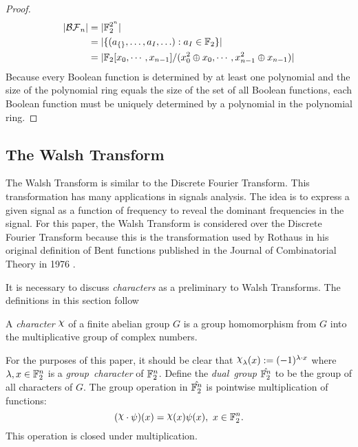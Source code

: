 \begin{proof}
  \begin{align*}
  \lvert\mathcal{BF}_n\rvert
    &= \lvert \mathbb{F}_2^{2^n} \rvert \\
    &= \lvert \{(a_{\{\}},\ldots,a_I,\ldots):a_I\in\mathbb{F}_2\} \rvert \\
    &= \lvert \mathbb{F}_2[x_0,\cdots,x_{n-1}]/ (x_0^2\oplus x_0,\cdots,
    x_{n-1}^2 \oplus x_{n-1})\rvert
  \end{align*}
  Because every Boolean function is determined by at least one polynomial
  and the size of the polynomial ring equals the size of the set of all
  Boolean functions, each Boolean function must be uniquely determined by a
  polynomial in the polynomial ring.
\end{proof}

\subsection{The Walsh Transform}
\par The Walsh Transform is similar to the Discrete Fourier Transform.
This transformation has many applications in signals
analysis. The idea is to express a given signal as a function of frequency
to reveal the dominant frequencies in the signal. For this paper, the Walsh
Transform is considered over the Discrete Fourier Transform because this is
the transformation used by Rothaus in his original definition of Bent
functions published in the Journal of Combinatorial Theory in 1976
\cite{art:r76}. 

\par It is necessary to discuss \textit{characters} as a preliminary to Walsh
Transforms. The definitions in this section follow \cite{bk:lsy11}

\begin{definition}
  A {\em character} $\Chi$ of a finite abelian group $G$ is a group
  homomorphism from $G$ into the multiplicative group of complex numbers.
\end{definition}

For the purposes of this paper, it should be clear that
$\Chi_\lambda(x):=(-1)^{\lambda\cdot x}$ where $\lambda,x\in\mathbb{F}_2^n$ is a
{\em group\ character} of $\mathbb{F}_2^n$. Define the {\em dual\ group}
$\hat{\mathbb{F}_2^n}$ to be the group of all characters of $G$. The group
operation
in $\hat{\mathbb{F}_2^n}$ is pointwise multiplication of functions:
\[
(\Chi\cdot\psi)(x)=\Chi(x)\psi(x),\ x\in\gftwo^n.
\]
This operation is closed under multiplication.


